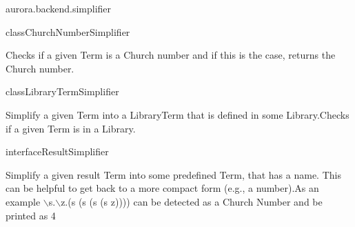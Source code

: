 \begin{texdocpackage}{aurora.backend.simplifier}
\label{texdoclet:aurora.backend.simplifier}

\begin{texdocclass}{class}{ChurchNumberSimplifier}
\label{texdoclet:aurora.backend.simplifier.ChurchNumberSimplifier}
\begin{texdocclassintro}
Checks if a given Term is a Church number and if this is the case, returns the Church number.\end{texdocclassintro}
\begin{texdocclassconstructors}
\end{texdocclassconstructors}
\begin{texdocclassmethods}
\end{texdocclassmethods}
\end{texdocclass}


\begin{texdocclass}{class}{LibraryTermSimplifier}
\label{texdoclet:aurora.backend.simplifier.LibraryTermSimplifier}
\begin{texdocclassintro}
Simplify a given Term into a LibraryTerm that is defined in some Library.\texdocbr  Checks if a given Term is in a Library.\end{texdocclassintro}
\begin{texdocclassconstructors}
\end{texdocclassconstructors}
\begin{texdocclassmethods}
\end{texdocclassmethods}
\end{texdocclass}


\begin{texdocclass}{interface}{ResultSimplifier}
\label{texdoclet:aurora.backend.simplifier.ResultSimplifier}
\begin{texdocclassintro}
Simplify a given result Term into some predefined Term, that has a name.
 This can be helpful to get back to a more compact form (e.g., a number).\texdocbr  As an example $\backslash$s.$\backslash$z.(s (s (s (s z)))) can be detected as a Church Number and be printed as 4\end{texdocclassintro}
\begin{texdocclassmethods}
\end{texdocclassmethods}
\end{texdocclass}


\end{texdocpackage}
